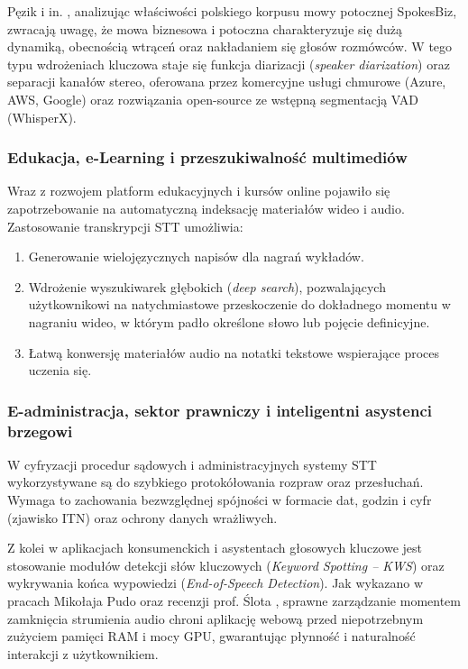 Pęzik i in. \cite[s.~1--4]{pezik2023spokesbiz}, analizując właściwości polskiego korpusu mowy potocznej SpokesBiz, zwracają uwagę, że mowa biznesowa i potoczna charakteryzuje się dużą dynamiką, obecnością wtrąceń oraz nakładaniem się głosów rozmówców. W tego typu wdrożeniach kluczowa staje się funkcja diarizacji (\textit{speaker diarization}) oraz separacji kanałów stereo, oferowana przez komercyjne usługi chmurowe (Azure, AWS, Google) oraz rozwiązania open-source ze wstępną segmentacją VAD (WhisperX).

\subsubsection{Edukacja, e-Learning i przeszukiwalność multimediów}

Wraz z rozwojem platform edukacyjnych i kursów online pojawiło się zapotrzebowanie na automatyczną indeksację materiałów wideo i audio. Zastosowanie transkrypcji STT umożliwia:
\begin{enumerate}
    \item Generowanie wielojęzycznych napisów dla nagrań wykładów.
    \item Wdrożenie wyszukiwarek głębokich (\textit{deep search}), pozwalających użytkownikowi na natychmiastowe przeskoczenie do dokładnego momentu w nagraniu wideo, w którym padło określone słowo lub pojęcie definicyjne.
    \item Łatwą konwersję materiałów audio na notatki tekstowe wspierające proces uczenia się.
\end{enumerate}

\subsubsection{E-administracja, sektor prawniczy i inteligentni asystenci brzegowi}

W cyfryzacji procedur sądowych i administracyjnych systemy STT wykorzystywane są do szybkiego protokółowania rozpraw oraz przesłuchań. Wymaga to zachowania bezwzględnej spójności w formacie dat, godzin i cyfr (zjawisko ITN) oraz ochrony danych wrażliwych.

Z kolei w aplikacjach konsumenckich i asystentach głosowych kluczowe jest stosowanie modułów detekcji słów kluczowych (\textit{Keyword Spotting -- KWS}) oraz wykrywania końca wypowiedzi (\textit{End-of-Speech Detection}). Jak wykazano w pracach Mikołaja Pudo \cite[s.~16]{pudo2024optimizing} oraz recenzji prof. Ślota \cite{slot2024recenzja}, sprawne zarządzanie momentem zamknięcia strumienia audio chroni aplikację webową przed niepotrzebnym zużyciem pamięci RAM i mocy GPU, gwarantując płynność i naturalność interakcji z użytkownikiem.

